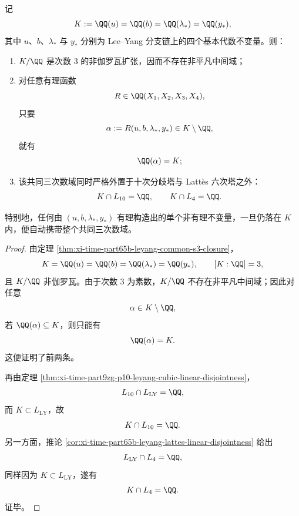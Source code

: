 \begin{theorem}[共同三次数域的素数度原始性与双外置性]\label{thm:conclusion-leyang-common-cubic-prime-degree-externality}
记
\[
K:=\QQ(u)=\QQ(b)=\QQ(\lambda_*)=\QQ(y_*),
\]
其中 \(u\)、\(b\)、\(\lambda_*\) 与 \(y_*\) 分别为 Lee--Yang 分支链上的四个基本代数不变量。则：
\begin{enumerate}
  \item \(K/\QQ\) 是次数 \(3\) 的非伽罗瓦扩张，因而不存在非平凡中间域；
  \item 对任意有理函数
  \[
  R\in \QQ(X_1,X_2,X_3,X_4),
  \]
  只要
  \[
  \alpha:=R(u,b,\lambda_*,y_*)\in K\setminus \QQ,
  \]
  就有
  \[
  \QQ(\alpha)=K;
  \]
  \item 该共同三次数域同时严格外置于十次分歧塔与 Latt\`es 六次塔之外：
  \[
  K\cap L_{10}=\QQ,
  \qquad
  K\cap L_4=\QQ.
  \]
\end{enumerate}
特别地，任何由 \((u,b,\lambda_*,y_*)\) 有理构造出的单个非有理不变量，一旦仍落在 \(K\) 内，便自动携带整个共同三次数域。
\end{theorem}
\begin{proof}
由定理 \ref{thm:xi-time-part65b-leyang-common-s3-closure}，
\[
K=\QQ(u)=\QQ(b)=\QQ(\lambda_*)=\QQ(y_*),
\qquad
[K:\QQ]=3,
\]
且 \(K/\QQ\) 非伽罗瓦。由于次数 \(3\) 为素数，\(K/\QQ\) 不存在非平凡中间域；因此对任意
\[
\alpha\in K\setminus \QQ,
\]
若 \(\QQ(\alpha)\subseteq K\)，则只能有
\[
\QQ(\alpha)=K.
\]
这便证明了前两条。

再由定理 \ref{thm:xi-time-part9zg-p10-leyang-cubic-linear-disjointness}，
\[
L_{10}\cap L_{\mathrm{LY}}=\QQ,
\]
而 \(K\subset L_{\mathrm{LY}}\)，故
\[
K\cap L_{10}=\QQ.
\]
另一方面，推论 \ref{cor:xi-time-part65b-leyang-lattes-linear-disjointness} 给出
\[
L_{\mathrm{LY}}\cap L_4=\QQ,
\]
同样因为 \(K\subset L_{\mathrm{LY}}\)，遂有
\[
K\cap L_4=\QQ.
\]
证毕。
\end{proof}


